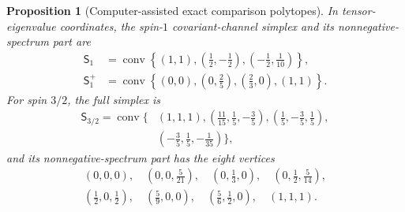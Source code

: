 \documentclass[twoside,10pt]{article}
\numberwithin{equation}{section}
\theoremstyle{slbody}
\newtheorem{proposition}[theorem]{Proposition}
\theoremstyle{definition}
\theoremstyle{remark}
\newcommand{\conv}{\operatorname{conv}}
\begin{document}
\begin{proposition}[Computer-assisted exact comparison polytopes]
\label{prop:comparison-polytopes}
In tensor-eigenvalue coordinates, the spin-\(1\) covariant-channel
simplex and its nonnegative-spectrum part are
\begin{align}
 \mathsf S_1
 &=\conv\left\{
 (1,1),\left(\tfrac12,-\tfrac12\right),
 \left(-\tfrac12,\tfrac1{10}\right)\right\},                 \label{eq:spin-one-simplex}\\
 \mathsf S_1^+
 &=\conv\left\{
 (0,0),\left(0,\tfrac25\right),
 \left(\tfrac23,0\right),(1,1)\right\}.                      \label{eq:spin-one-positive-polytope}
\end{align}
For spin \(3/2\), the full simplex is
\begin{equation}\label{eq:spin-three-simplex}
\begin{split}
 \mathsf S_{3/2}=\conv\{&
 (1,1,1),
 \left(\tfrac{11}{15},\tfrac15,-\tfrac35\right),
 \left(\tfrac15,-\tfrac35,\tfrac15\right),\\
 &\left(-\tfrac35,\tfrac15,-\tfrac1{35}\right)\},
\end{split}
\end{equation}
and its nonnegative-spectrum part has the eight vertices
\begin{equation}\label{eq:spin-three-positive-polytope}
\begin{split}
 (0,0,0),\quad
 \left(0,0,\tfrac5{21}\right),\quad
 \left(0,\tfrac13,0\right),\quad
 \left(0,\tfrac12,\tfrac5{14}\right),\\
 \left(\tfrac12,0,\tfrac12\right),\quad
 \left(\tfrac59,0,0\right),\quad
 \left(\tfrac56,\tfrac12,0\right),\quad
 (1,1,1).
\end{split}
\end{equation}
\end{proposition}
\end{document}
